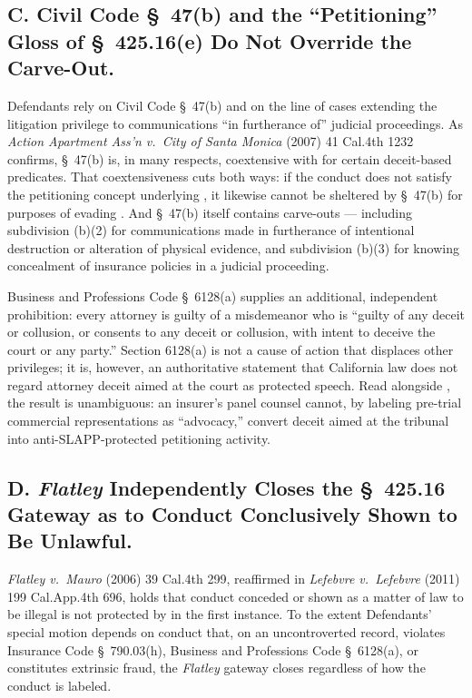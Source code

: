 \subsection*{C. Civil Code \S~47(b) and the ``Petitioning'' Gloss of \S~425.16(e) Do Not Override the Carve-Out.}

Defendants rely on Civil Code \S~47(b) and on the line of cases extending the litigation privilege to communications ``in furtherance of'' judicial proceedings. As \textit{Action Apartment Ass'n v.\ City of Santa Monica} (2007) 41 Cal.4th 1232 confirms, \S~47(b) is, in many respects, coextensive with  for certain deceit-based predicates. That coextensiveness cuts both ways: if the conduct does not satisfy the petitioning concept underlying , it likewise cannot be sheltered by \S~47(b) for purposes of evading . And \S~47(b) itself contains carve-outs --- including subdivision (b)(2) for communications made in furtherance of intentional destruction or alteration of physical evidence, and subdivision (b)(3) for knowing concealment of insurance policies in a judicial proceeding.

Business and Professions Code \S~6128(a) supplies an additional, independent prohibition: every attorney is guilty of a misdemeanor who is ``guilty of any deceit or collusion, or consents to any deceit or collusion, with intent to deceive the court or any party.'' Section 6128(a) is not a cause of action that displaces other privileges; it is, however, an authoritative statement that California law does not regard attorney deceit aimed at the court as protected speech. Read alongside , the result is unambiguous: an insurer's panel counsel cannot, by labeling pre-trial commercial representations as ``advocacy,'' convert deceit aimed at the tribunal into anti-SLAPP-protected petitioning activity.

\subsection*{D. \textit{Flatley} Independently Closes the \S~425.16 Gateway as to Conduct Conclusively Shown to Be Unlawful.}

\textit{Flatley v.\ Mauro} (2006) 39 Cal.4th 299, reaffirmed in \textit{Lefebvre v.\ Lefebvre} (2011) 199 Cal.App.4th 696, holds that conduct conceded or shown as a matter of law to be illegal is not protected by  in the first instance. To the extent Defendants' special motion depends on conduct that, on an uncontroverted record, violates Insurance Code \S~790.03(h), Business and Professions Code \S~6128(a), or constitutes extrinsic fraud, the \textit{Flatley} gateway closes regardless of how the conduct is labeled.

